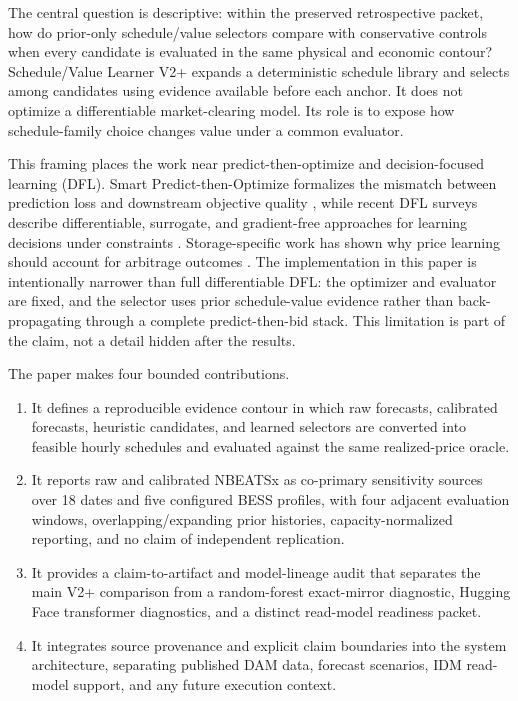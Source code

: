 The central question is descriptive: within the preserved retrospective packet, how do prior-only schedule/value selectors compare with conservative controls when every candidate is evaluated in the same physical and economic contour? Schedule/Value Learner V2+ expands a deterministic schedule library and selects among candidates using evidence available before each anchor. It does not optimize a differentiable market-clearing model. Its role is to expose how schedule-family choice changes value under a common evaluator.

This framing places the work near predict-then-optimize and decision-focused learning (DFL). Smart Predict-then-Optimize formalizes the mismatch between prediction loss and downstream objective quality \cite{elmachtoub2022spo}, while recent DFL surveys describe differentiable, surrogate, and gradient-free approaches for learning decisions under constraints \cite{mandi2024dfl}. Storage-specific work has shown why price learning should account for arbitrage outcomes \cite{sang2022essdfl}. The implementation in this paper is intentionally narrower than full differentiable DFL: the optimizer and evaluator are fixed, and the selector uses prior schedule-value evidence rather than back-propagating through a complete predict-then-bid stack. This limitation is part of the claim, not a detail hidden after the results.

The paper makes four bounded contributions.

\begin{enumerate}
\item It defines a reproducible evidence contour in which raw forecasts, calibrated forecasts, heuristic candidates, and learned selectors are converted into feasible hourly schedules and evaluated against the same realized-price oracle.
\item It reports raw and calibrated NBEATSx as co-primary sensitivity sources over 18 dates and five configured BESS profiles, with four adjacent evaluation windows, overlapping/expanding prior histories, capacity-normalized reporting, and no claim of independent replication.
\item It provides a claim-to-artifact and model-lineage audit that separates the main V2+ comparison from a random-forest exact-mirror diagnostic, Hugging Face transformer diagnostics, and a distinct read-model readiness packet.
\item It integrates source provenance and explicit claim boundaries into the system architecture, separating published DAM data, forecast scenarios, IDM read-model support, and any future execution context.
\end{enumerate}

